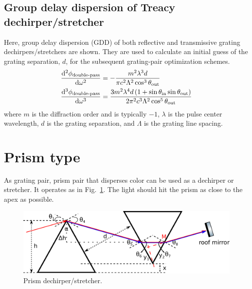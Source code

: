 \documentclass[12pt,hidelinks]{book}
\begin{document}
\subsection{Group delay dispersion of Treacy dechirper/stretcher}
Here, group delay dispersion (GDD) of both reflective and transmissive grating dechirpers/stretchers are shown. They are used to calculate an initial guess of the grating separation, $d$, for the subsequent grating-pair optimization schemes.
\begin{subequations}
\begin{align}
\dod[2]{\phi_{\text{double-pass}}}{\omega} & =-\frac{m^2\lambda^3d}{\pi c^2\Lambda^2\cos^3\theta_{\text{out}}} \\
\dod[3]{\phi_{\text{double-pass}}}{\omega} & =\frac{3m^2\lambda^4d\left(1+\sin\theta_{\text{in}}\sin\theta_{\text{out}}\right)}{2\pi^2c^3\Lambda^2\cos^5\theta_{\text{out}}}
\end{align}
\end{subequations}
where $m$ is the diffraction order and is typically $-1$, $\lambda$ is the pulse center wavelength, $d$ is the grating separation, and $\Lambda$ is the grating line spacing.

\section{Prism type}
As grating pair, prism pair that disperses color can be used as a dechirper or stretcher. It operates as in Fig.~\ref{fig:prism}. The light should hit the prism as close to the apex as possible.
\begin{figure}[htbp]
\centering
\includegraphics[width=\linewidth]{prism.pdf}
\caption{Prism dechirper/stretcher.}
\label{fig:prism}
\end{figure}
\end{document}
